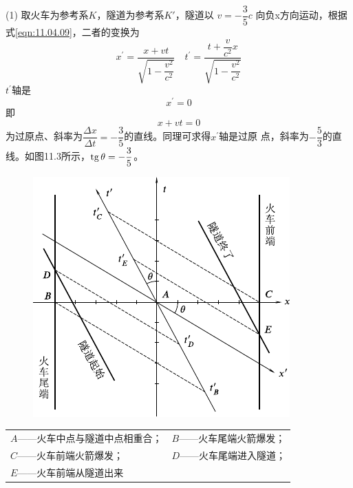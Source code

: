 (1) 取火车为参考系$ K $，隧道为参考系$ K' $，隧道以
$ v = - \dfrac { 3 } { 5 } c $
向负x方向运动，根据式\eqref{eqn:11.04.09}，二者的变换为
\begin{equation*}
  x^{\prime}=\frac{x+v t}{\sqrt{1-\dfrac{v^{2}}{c^{2}}}} \quad t^{\prime}=\frac{t+\dfrac{v}{c^{2}} x}{\sqrt{1-\dfrac{v^{2}}{c^{2}}}}
\end{equation*}
$ t ^ { \prime } $轴是
\begin{equation*}
  x ^ { \prime } = 0
\end{equation*}
即
\begin{equation*}
  x + v t = 0
\end{equation*}
为过原点、斜率为$ \dfrac { \Delta x } { \Delta t } = - \dfrac { 3 } { 5 } $的直线。同理可求得$ x ^ { \prime } $轴是过原
点，斜率为$ - \dfrac { 5 } { 3 } $的直线。如图11.3所示，$ \operatorname{tg} \theta = - \dfrac { 3 } { 5 } $。

\clearpage
\begin{figure}[h]
  \centering
  \includegraphics{figure/fig11.03}
  \caption{}
  \label{fig:11.03}
\end{figure}

\begin{center}
  \begin{tabular}{ll}
    $ A $——火车中点与隧道中点相重合； & $ B $——火车尾端火箭爆发； \\
    $ C $——火车前端火箭爆发；     & $ D $——火车尾端进入隧道； \\
    $ E $——火车前端从隧道出来     &                  \\
  \end{tabular}
\end{center}

